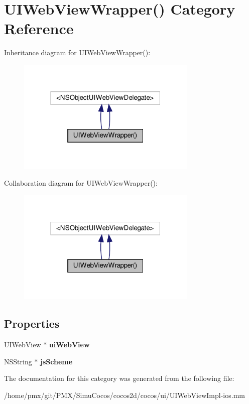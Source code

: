\hypertarget{categoryUIWebViewWrapper_07_08}{}\section{U\+I\+Web\+View\+Wrapper() Category Reference}
\label{categoryUIWebViewWrapper_07_08}


Inheritance diagram for U\+I\+Web\+View\+Wrapper()\+:
\nopagebreak
\begin{figure}[H]
\begin{center}
\leavevmode
\includegraphics[width=243pt]{categoryUIWebViewWrapper_07_08__inherit__graph}
\end{center}
\end{figure}


Collaboration diagram for U\+I\+Web\+View\+Wrapper()\+:
\nopagebreak
\begin{figure}[H]
\begin{center}
\leavevmode
\includegraphics[width=243pt]{categoryUIWebViewWrapper_07_08__coll__graph}
\end{center}
\end{figure}
\subsection*{Properties}
\begin{DoxyCompactItemize}
\item 
\mbox{\label{categoryUIWebViewWrapper_07_08_aa37325f2700f48920ca7828641d82f92}} 
U\+I\+Web\+View $\ast$ {\bfseries ui\+Web\+View}
\item 
\mbox{\label{categoryUIWebViewWrapper_07_08_a9c69d831da19f026a43c00559a8c6bd4}} 
N\+S\+String $\ast$ {\bfseries js\+Scheme}
\end{DoxyCompactItemize}


The documentation for this category was generated from the following file\+:\begin{DoxyCompactItemize}
\item 
/home/pmx/git/\+P\+M\+X/\+Simu\+Cocos/cocos2d/cocos/ui/U\+I\+Web\+View\+Impl-\/ios.\+mm\end{DoxyCompactItemize}
